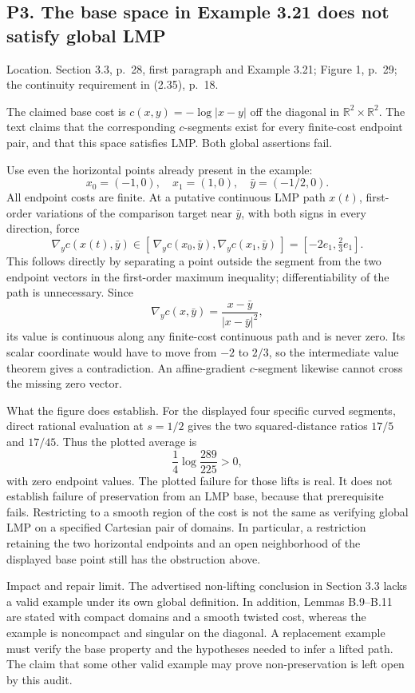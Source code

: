 \documentclass[10pt]{article}
\begin{document}
\subsection*{P3. The base space in Example 3.21 does not satisfy global LMP}
Location. Section 3.3, p. 28, first paragraph and Example 3.21; Figure 1, p. 29; the continuity requirement in (2.35), p. 18.\par
The claimed base cost is \(c(x,y)=-\log|x-y|\) off the diagonal in \(\mathbb R^2\times\mathbb R^2\). The text claims that the corresponding \(c\)-segments exist for every finite-cost endpoint pair, and that this space satisfies LMP. Both global assertions fail.\par
Use even the horizontal points already present in the example: \[x_0=(-1,0),\quad x_1=(1,0),\quad \bar y=(-1/2,0).\] All endpoint costs are finite. At a putative continuous LMP path \(x(t)\), first-order variations of the comparison target near \(\bar y\), with both signs in every direction, force \[\nabla_y c(x(t),\bar y)\in
 [\,\nabla_y c(x_0,\bar y),\nabla_y c(x_1,\bar y)\,]
 =[-2e_1,\tfrac23e_1].\] This follows directly by separating a point outside the segment from the two endpoint vectors in the first-order maximum inequality; differentiability of the path is unnecessary. Since \[\nabla_y c(x,\bar y)=\frac{x-\bar y}{|x-\bar y|^2},\] its value is continuous along any finite-cost continuous path and is never zero. Its scalar coordinate would have to move from \(-2\) to \(2/3\), so the intermediate value theorem gives a contradiction. An affine-gradient \(c\)-segment likewise cannot cross the missing zero vector.\par
What the figure does establish. For the displayed four specific curved segments, direct rational evaluation at \(s=1/2\) gives the two squared-distance ratios \(17/5\) and \(17/45\). Thus the plotted average is \[\frac14\log\frac{289}{225}>0,\] with zero endpoint values. The plotted failure for those lifts is real. It does not establish failure of preservation from an LMP base, because that prerequisite fails. Restricting to a smooth region of the cost is not the same as verifying global LMP on a specified Cartesian pair of domains. In particular, a restriction retaining the two horizontal endpoints and an open neighborhood of the displayed base point still has the obstruction above.\par
Impact and repair limit. The advertised non-lifting conclusion in Section 3.3 lacks a valid example under its own global definition. In addition, Lemmas B.9–B.11 are stated with compact domains and a smooth twisted cost, whereas the example is noncompact and singular on the diagonal. A replacement example must verify the base property and the hypotheses needed to infer a lifted path. The claim that some other valid example may prove non-preservation is left open by this audit.\par
\end{document}
